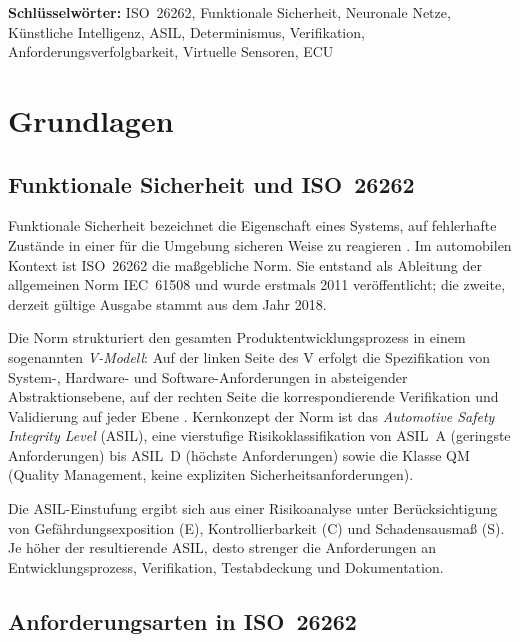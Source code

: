 ﻿\documentclass[12pt,a4paper]{article}
\begin{document}
\textbf{Schl\"usselw\"orter:} ISO~26262, Funktionale Sicherheit, Neuronale
Netze, K\"unstliche Intelligenz, ASIL, Determinismus, Verifikation,
Anforderungsverfolgbarkeit, Virtuelle Sensoren, ECU

\section{Grundlagen}
\label{sec:grundlagen}

\subsection{Funktionale Sicherheit und ISO~26262}
\label{subsec:iso_grundlagen}

Funktionale Sicherheit bezeichnet die Eigenschaft eines Systems, auf fehlerhafte
Zust\"ande in einer f\"ur die Umgebung sicheren Weise zu reagieren
\cite{iec61508}. Im automobilen Kontext ist ISO~26262 die ma\ss{}gebliche Norm. Sie
entstand als Ableitung der allgemeinen Norm IEC~61508 und wurde erstmals 2011
ver\"offentlicht; die zweite, derzeit g\"ultige Ausgabe stammt aus dem Jahr 2018.

Die Norm strukturiert den gesamten Produktentwicklungsprozess in einem sogenannten
\emph{V-Modell}: Auf der linken Seite des V erfolgt die Spezifikation von
System-, Hardware- und Software-Anforderungen in absteigender Abstraktionsebene,
auf der rechten Seite die korrespondierende Verifikation und Validierung auf jeder
Ebene \cite{iso26262_2}. Kernkonzept der Norm ist das
\emph{Automotive Safety Integrity Level} (ASIL), eine vierstufige Risikoklassifikation
von ASIL~A (geringste Anforderungen) bis ASIL~D (h\"ochste Anforderungen) sowie die
Klasse QM (Quality Management, keine expliziten Sicherheitsanforderungen).

Die ASIL-Einstufung ergibt sich aus einer Risikoanalyse unter Ber\"ucksichtigung von
Gef\"ahrdungsexposition (E), Kontrollierbarkeit (C) und Schadensausma\ss{} (S). Je
h\"oher der resultierende ASIL, desto strenger die Anforderungen an
Entwicklungsprozess, Verifikation, Testabdeckung und Dokumentation.

\subsection{Anforderungsarten in ISO~26262}
\label{subsec:anforderungsarten}
\end{document}
